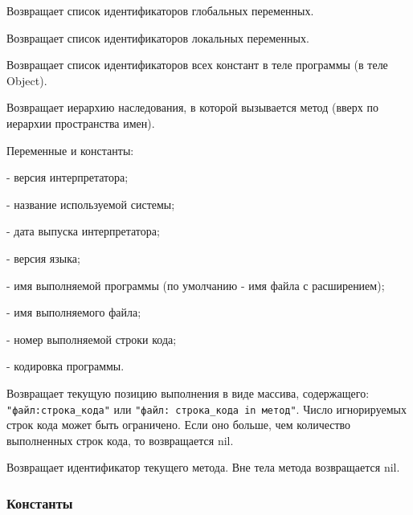 \begin{methodlist}
  Возвращает список идентификаторов глобальных переменных. 

  Возвращает список идентификаторов локальных переменных.

  Возвращает список идентификаторов всех констант в теле программы (в теле Object).

  Возвращает иерархию наследования, в которой вызывается метод (вверх по иерархии пространства имен).

  \begin{keylist}{Переменные и константы:}
    
     - версия интерпретатора;
    
     - название используемой системы;
    
     - дата выпуска интерпретатора;
    
     - версия языка;
    
      - имя выполняемой программы (по умолчанию - имя файла с расширением);
    
     - имя выполняемого файла; 
    
     - номер выполняемой строки кода;
    
     - кодировка программы.
  \end{keylist}

  Возвращает текущую позицию выполнения в виде массива, содержащего: \verb!"файл:строка_кода"! или \verb!"файл: строка_кода in метод"!. Число игнорируемых строк кода может быть ограничено. Если оно больше, чем количество выполненных строк кода, то возвращается nil. 

  Возвращает идентификатор текущего метода. Вне тела метода возвращается nil.
\end{methodlist}

\subsubsection*{Константы} 

